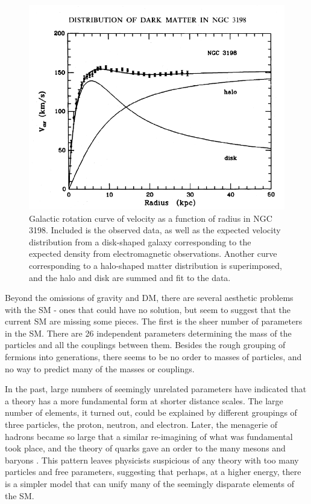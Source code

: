 \begin{centering}
\begin{figure}[bth]
\myfloatalign
\includegraphics[width=.85\linewidth]{figures/theory/rotatioanl_curve_ngc3198_rc.png}
\caption{Galactic rotation curve of velocity as a function of radius in NGC 3198. Included is the observed data, as well as the expected velocity distribution from a disk-shaped galaxy corresponding to the expected density from electromagnetic observations. Another curve corresponding to a halo-shaped matter distribution is superimposed, and the halo and disk are summed and fit to the data. \cite{1985ApJ...295..305V}}
\label{fig:dm_curve}
\end{figure}
\end{centering}

Beyond the omissions of gravity and \ac{DM}, there are several aesthetic problems with the \ac{SM} - ones that could have no solution, but seem to suggest that the current \ac{SM} are missing some pieces. The first is the sheer number of parameters in the \ac{SM}. There are 26 independent parameters determining the mass of the particles and all the couplings between them. Besides the rough grouping of fermions into generations, there seems to be no order to masses of particles, and no way to predict many of the masses or couplings. 

In the past, large numbers of seemingly unrelated parameters have indicated that a theory has a more fundamental form at shorter distance scales. The large number of elements, it turned out, could be explained by different groupings of three particles, the proton, neutron, and electron. Later, the menagerie of hadrons became so large that a similar re-imagining of what was fundamental took place, and the theory of quarks gave an order to the many mesons and baryons \cite{Gell-Mann_1961}. This pattern leaves physicists suspicious of any theory with too many particles and free parameters, suggesting that perhaps, at a higher energy, there is a simpler model that can unify many of the seemingly disparate elements of the \ac{SM}. 

